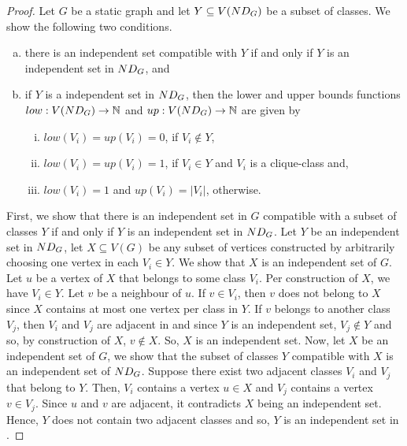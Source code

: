 \begin{proof}
    Let $G$ be a static graph and let $Y \subseteq V(\ndg[G])$ be a subset of classes. We show the following two conditions.
  \begin{enumerate}[(a)]
    \item there is an independent set compatible with $Y$ if and only if $Y$ is an independent set in $\ndg[G]$, and
    \item if $Y$ is a independent set in $\ndg[G]$, then the lower and upper bounds functions $low : V(\ndg[G])  \to \mathbb{N}$ and $up : V(\ndg[G]) \to \mathbb{N}$ are given by
    \begin{enumerate}[(i)]
      \item $low(V_i) = up(V_i) =0$, if $V_i\not\in Y$,
      \item $low(V_i) = up(V_i) = 1$, if $V_i\in Y$ and $V_i$ is a clique-class and,
      \item $low(V_i)=1$ and $up(V_i) =|V_i|$, otherwise.
    \end{enumerate}

  \end{enumerate}
  
  First, we show that there is an independent set in $G$ compatible with a subset of classes $Y$ if and only if $Y$ is an independent set in $\ndg[G]$.
  Let $Y$ be an independent set in $\ndg[G]$, let $X \subseteq V(G)$ be any subset of vertices constructed by arbitrarily choosing one vertex in each $V_i \in Y$.
  We show that $X$ is an independent set of $G$. Let $u$ be a vertex of $X$ that belongs to some class $V_i$. Per construction of $X$, we have $V_i \in Y$. Let $v$ be a neighbour of $u$. If $v \in V_i$, then $v$ does not belong to $X$ since $X$ contains at most one vertex per class in $Y$. If $v$ belongs to another class $V_j$, then $V_i$ and $V_j$ are adjacent in \ndg[G] and since $Y$ is an independent set, $V_j \not \in Y$ and so, by construction of $X$, $v \not\in X$. So, $X$ is an independent set.
  Now, let $X$ be an independent set of $G$, we show that the subset of classes $Y$ compatible with $X$ is an independent set of $\ndg[G]$. Suppose there exist two adjacent classes $V_i$ and $V_j$ that belong to $Y$. Then, $V_i$ contains a vertex $u \in X$ and $V_j$ contains a vertex $v \in V_j$. Since $u$ and $v$ are adjacent, it contradicts $X$ being an independent set. Hence, $Y$ does not contain two adjacent classes and so, $Y$ is an independent set in \ndg[G].
  

\end{proof}
